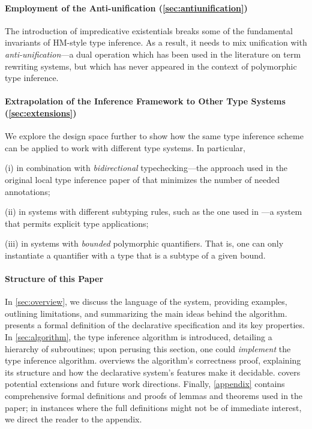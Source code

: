\paragraph{Employment of the Anti-unification (\cref{sec:antiunification})}
    The introduction of impredicative existentials breaks some of the
    fundamental invariants of HM-style type inference. As a result, it needs to
    mix unification with \emph{anti-unification}---a dual operation which has
    been used in the literature on term rewriting systems, but which has never
    appeared in the context of polymorphic type inference.

\paragraph{Extrapolation of the Inference Framework to Other Type Systems
          (\cref{sec:extensions})}
    We explore the design space further to show how the
    same type inference scheme can be applied to
    work with different type systems. In particular,
    \begin{enumerate*}
      \item[(i)] in combination with \emph{bidirectional} typechecking---the 
        approach used in the original local type inference paper of 
        \citet{pierce2000:local} that minimizes the number of needed annotations;
      \item[(ii)] in systems with different subtyping rules, such as  
        the one used in \citet{zhao22:elementary}---a system that
        permits explicit type applications;
      \item[(iii)] in systems with \emph{bounded} polymorphic quantifiers.
        That is, one can only instantiate a quantifier with a 
        type that is a subtype of a given bound.
    \end{enumerate*}
  
\paragraph{\textbf{Structure of this Paper}}
In \cref{sec:overview}, we discuss the language of the \fexists system, providing
examples, outlining limitations, and summarizing the main ideas behind the
algorithm.  presents a formal definition of the
declarative specification and its key properties. In \cref{sec:algorithm}, the
type inference algorithm is introduced, detailing a hierarchy of subroutines;
upon perusing this section, one could \emph{implement} the type inference
algorithm.  overviews the algorithm's correctness proof,
explaining its structure and how the declarative system's features make it
decidable.  covers potential \fexists extensions and future
work directions. Finally, \cref{appendix} contains comprehensive formal
definitions and proofs of lemmas and theorems used in the paper; in instances
where the full definitions might not be of immediate interest, we direct the
reader to the appendix.

